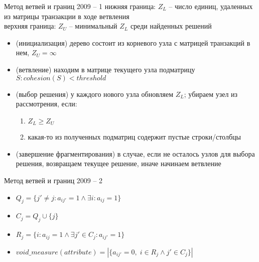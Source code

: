 \documentclass[10pt, dvipsnames]{beamer}
\begin{document}
\begin{frame}{Метод ветвей и границ 2009 -- 1}
нижняя граница: $Z_L$ -- число единиц, удаленных из матрицы транзакции в ходе ветвления\\[0.1cm]
верхняя граница: $Z_U$ -- минимальный $Z_L$ среди найденных решений\\[0.2cm] 
	\begin{itemize}
	\item (инициализация) дерево состоит из корневого узла с матрицей транзакций в нем, $Z_U = \infty$
	\item (ветвление) находим в матрице текущего узла подматрицу $S : cohesion(S) < threshold$
	\item (выбор решения) у каждого нового узла обновляем $Z_L$; убираем узел из рассмотрения, если:
		\begin{enumerate}
			\item $Z_L \geq Z_U$
			\item какая-то из полученных подматриц содержит пустые строки/столбцы
		\end{enumerate}
	\item (завершение фрагментирования) в случае, если не осталось узлов для выбора решения, возвращаем текущее решение, иначе начинаем ветвление
	\end{itemize}
\end{frame}

\begin{frame}{Метод ветвей и границ 2009 -- 2}
	\begin{itemize}
	\item $Q_j = \{j'\neq j:a_{ij'} = 1 \land \exists i : a_{ij} = 1\}$
	\item $C_j = Q_j \cup \{j\}$
	\item $R_j = \{i:a_{ij} = 1 \land \exists j' \in C_j : a_{ij'} = 1\}$
	\item $void\_measure(attribute) = |\{a_{ij'} = 0,\;i \in R_j \land j' \in C_j \}|$
	\end{itemize}	
\end{frame}
\end{document}
